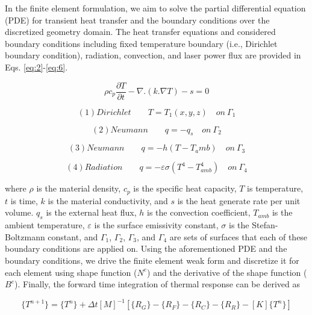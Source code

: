 \documentclass{article}
\begin{document}
In the finite element formulation, we aim to solve the partial differential equation (PDE) for transient heat transfer and the boundary conditions over the discretized geometry domain. The heat transfer equations and considered boundary conditions including fixed temperature boundary (i.e., Dirichlet boundary condition), radiation, convection, and laser power flux are provided in Eqs. \ref{eq:2}-\ref{eq:6}.

\begin{equation} \label{eq:2}
\rho c_p  \frac{\partial T}{\partial t} - \nabla . (k . \nabla T) - s = 0
\end{equation}

\begin{equation} \label{eq:3}
(1) Dirichlet \qquad		T=T_1 (x,y,z) \quad on \: \Gamma_1
\end{equation}

\begin{equation} \label{eq:4}
(2) Neumann \qquad		q= -q_s \quad on \: \Gamma_2
\end{equation}

\begin{equation} \label{eq:5}
(3) Neumann \qquad		q= -h(T-T_amb ) \quad on \: \Gamma_3
\end{equation}

\begin{equation} \label{eq:6}
(4) Radiation \qquad		q=-\varepsilon \sigma(T^4-T_{amb}^4 ) \quad on \: \Gamma_4
\end{equation}

where $\rho$ is the material density, $c_p$ is the specific heat capacity, $T$ is temperature, $t$ is time, $k$ is the material conductivity, and $s$ is the heat generate rate per unit volume. $q_s$ is the external heat flux, $h$ is the convection coefficient, $T_{amb}$ is the ambient temperature, $\varepsilon$ is the surface emissivity constant, $\sigma$ is the Stefan-Boltzmann constant, and $\Gamma_1$,  $\Gamma_2$,  $\Gamma_3$, and  $\Gamma_4$ are sets of surfaces that each of these boundary conditions are applied on. Using the aforementioned PDE and the boundary conditions, we drive the finite element weak form and discretize it for each element using shape function ($N^e$) and the derivative of the shape function ($B^e$). Finally, the forward time integration of thermal response can be derived as 

\begin{equation} \label{eq:7}
\{T^{n+1} \}=\{T^n \}+\Delta t[M]^{-1} [\{R_G \}-\{R_F \}-\{R_C \}-\{R_R \}-[K]\{T^n \}]
\end{equation}
\end{document}
